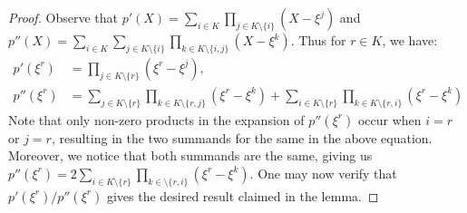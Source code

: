 \documentclass[sigconf]{acmart}
\providecommand{\DIFaddbegin}{} %
\providecommand{\DIFaddend}{} %
\newcommand{\DIFaddincludegraphics}[2][]{{\color{blue}\fbox{\DIFOincludegraphics[#1]{#2}}}} %
\DeclareRobustCommand{\DIFaddbegin}{\DIFOaddbegin \let\includegraphics\DIFaddincludegraphics} %
\DeclareRobustCommand{\DIFaddend}{\DIFOaddend \let\includegraphics\DIFOincludegraphics} %
\begin{document}
	\begin{proof}
		Observe that $p'(X)=\sum_{i\in K}\prod_{j\in K\setminus \{i\}}(X-\xi^j)$ and \DIFaddbegin \\
		\DIFaddend $p''(X)=\sum_{i\in K}\sum_{j\in K\setminus \{i\}}\prod_{k\in K\setminus \{i,j\}}(X-\xi^k)$. Thus for $r\in K$,
		we have:
		\begin{align*}
			p'(\xi^r) &= \prod_{j \in K \setminus \{r\}}(\xi^r-\xi^j), \\
			p''(\xi^r)&=\sum_{j\in K\setminus \{r\}}\prod_{k\in K\setminus \{r,j\}} (\xi^r-\xi^k)
			+\sum_{i\in K\setminus \{r\}}\prod_{k\in K\setminus \{r,i\}} (\xi^r-\xi^k)
		\end{align*}
		Note that only non-zero products in the expansion of $p''(\xi^r)$ occur when $i=r$ or $j=r$, resulting in the two summands for the same in the above equation.
		Moreover, we notice that both summands are the same, giving us $p''(\xi^r)=2\sum_{i\in K\setminus \{r\}}\prod_{k\in \setminus \{r,i\}}(\xi^r-\xi^k)$. One may
		now verify that $p'(\xi^r)/p''(\xi^r)$ gives the desired result claimed in the lemma.
	\end{proof}
	
	
	
	
	
\end{document}
